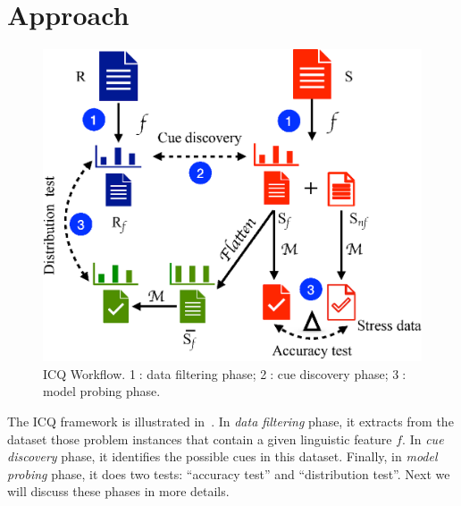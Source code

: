 \section{Approach}
\label{sec:approach}

\begin{figure}[th]
\centering
\includegraphics[width=0.8\columnwidth]{picture/framework.eps}
\caption{ICQ Workflow. \textcircled{1}: data filtering phase; \textcircled{2}: cue discovery phase; 
\textcircled{3}: model probing phase.}
\label{fig:framework}
\end{figure}

The ICQ framework is illustrated in~.
In \textit{data filtering} phase, it extracts from the dataset
those problem instances that contain a given linguistic feature $f$. 
In \textit{cue discovery} phase, it identifies the possible cues in this dataset. 
Finally, in \textit{model probing} phase,
it does two tests: ``accuracy test'' and ``distribution test''.
Next we will discuss these phases in more details.


